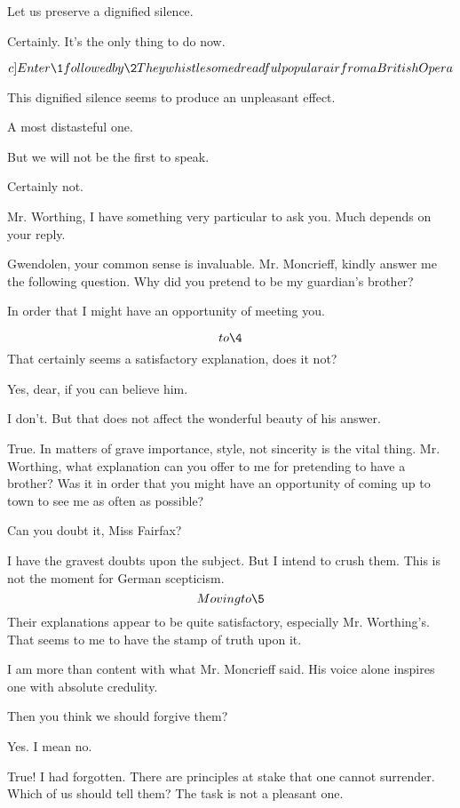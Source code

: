 \documentclass{book}
\begin{document}
\4  Let us preserve a dignified silence.

\5  Certainly.  It's the only thing to do now.

\[c]Enter \1 followed by \2  They whistle some dreadful\\ popular air from
a British Opera\]

\4  This dignified silence seems to produce an unpleasant
effect.

\5  A most distasteful one.

\4  But we will not be the first to speak.

\5  Certainly not.

\4  Mr. Worthing, I have something very particular to ask
you.  Much depends on your reply.

\5  Gwendolen, your common sense is invaluable.  Mr.
Moncrieff, kindly answer me the following question.  Why did you
pretend to be my guardian's brother?

\2  In order that I might have an opportunity of meeting
you.

\5  \[to \4\]  That certainly seems a satisfactory
explanation, does it not?

\4  Yes, dear, if you can believe him.

\5  I don't.  But that does not affect the wonderful beauty of
his answer.

\4  True.  In matters of grave importance, style, not
sincerity is the vital thing.  Mr. Worthing, what explanation can
you offer to me for pretending to have a brother?  Was it in order
that you might have an opportunity of coming up to town to see me
as often as possible?

\1  Can you doubt it, Miss Fairfax?

\4  I have the gravest doubts upon the subject.  But I
intend to crush them.  This is not the moment for German
scepticism.  \[Moving to \5\]  Their explanations appear to be
quite satisfactory, especially Mr. Worthing's.  That seems to me to
have the stamp of truth upon it.

\5  I am more than content with what Mr. Moncrieff said.  His
voice alone inspires one with absolute credulity.

\4  Then you think we should forgive them?

\5  Yes.  I mean no.

\4  True!  I had forgotten.  There are principles at stake
that one cannot surrender.  Which of us should tell them?  The task
is not a pleasant one.
\end{document}
